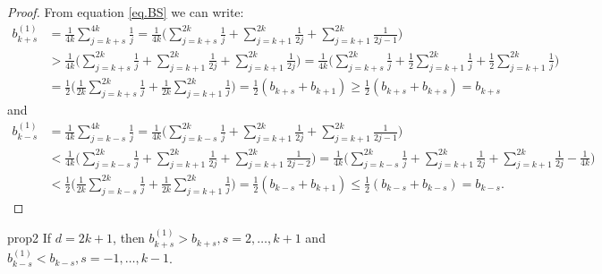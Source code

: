 \documentclass[entropy,article,submit,moreauthors,pdftex]{Definitions/mdpi}
\begin{document}
\begin{proof}
From equation \eqref{eq.BS} we can write:
\begin{equation*}
\begin{split}
b^{(1)}_{k+s}&=\frac{1}{4k}\sum_{j=k+s}^{4k}\frac{1}{j}
=\frac{1}{4k}\Bigg(\sum_{j=k+s}^{2k}\frac{1}{j}+\sum_{j=k+1}^{2k}\frac{1}{2j}+\sum_{j=k+1}^{2k}\frac{1}{2j-1}\Bigg)\\
&>\frac{1}{4k}\Bigg(\sum_{j=k+s}^{2k}\frac{1}{j}+\sum_{j=k+1}^{2k}\frac{1}{2j}+\sum_{j=k+1}^{2k}\frac{1}{2j}\Bigg)
=\frac{1}{4k}\Bigg(\sum_{j=k+s}^{2k}\frac{1}{j}+\frac{1}{2}\sum_{j=k+1}^{2k}\frac{1}{j}+\frac{1}{2}\sum_{j=k+1}^{2k}\frac{1}{j}\Bigg)\\
&=\frac{1}{2}\Bigg(\frac{1}{2k}\sum_{j=k+s}^{2k}\frac{1}{j}+\frac{1}{2k}\sum_{j=k+1}^{2k}\frac{1}{j}\Bigg)=\frac{1}{2}(b_{k+s}+b_{k+1})
\ge\frac{1}{2}(b_{k+s}+b_{k+s})=b_{k+s}
\end{split}
\end{equation*}
 and
\begin{equation*}
\begin{split}
b^{(1)}_{k-s}&=\frac{1}{4k}\sum_{j=k-s}^{4k}\frac{1}{j}
=\frac{1}{4k}\Bigg(\sum_{j=k-s}^{2k}\frac{1}{j}+\sum_{j=k+1}^{2k}\frac{1}{2j}+\sum_{j=k+1}^{2k}\frac{1}{2j-1}\Bigg)\\
&<\frac{1}{4k}\Bigg(\sum_{j=k-s}^{2k}\frac{1}{j}+\sum_{j=k+1}^{2k}\frac{1}{2j}+\sum_{j=k+1}^{2k}\frac{1}{2j-2}\Bigg)
=\frac{1}{4k}\Bigg(\sum_{j=k-s}^{2k}\frac{1}{j}+\sum_{j=k+1}^{2k}\frac{1}{2j}+\sum_{j=k+1}^{2k}\frac{1}{2j}-\frac{1}{4k}\Bigg)\\
&<\frac{1}{2}\Bigg(\frac{1}{2k}\sum_{j=k-s}^{2k}\frac{1}{j}+\frac{1}{2k}\sum_{j=k+1}^{2k}\frac{1}{j}\Bigg)
=\frac{1}{2}(b_{k-s}+b_{k+1})
\le\frac{1}{2}(b_{k-s}+b_{k-s})=b_{k-s}.
\end{split}
\end{equation*}
\end{proof}

\begin{repproposition}{prop2}
If $d=2k+1$, then $b^{(1)}_{k+s}>b_{k+s}, s=2,\ldots,k+1$ and $b^{(1)}_{k-s}<b_{k-s}, s=-1,\ldots,k-1$.
\end{repproposition}
\end{document}
